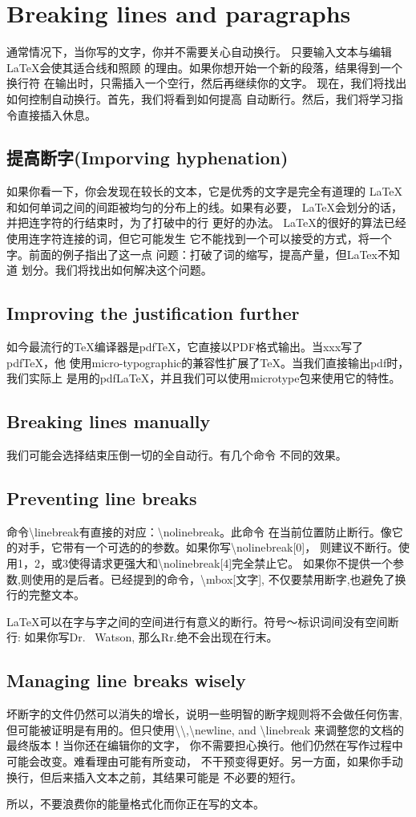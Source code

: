 \section{Breaking lines and paragraphs}
通常情况下，当你写的文字，你并不需要关心自动换行。
只要输入文本与编辑LaTeX会使其适合线和照顾
的理由。如果你想开始一个新的段落，结果得到一个换行符
在输出时，只需插入一个空行，然后再继续你的文字。
现在，我们将找出如何控制自动换行。首先，我们将看到如何提高
自动断行。然后，我们将学习指令直接插入休息。
\subsection{提高断字(Imporving hyphenation)}
如果你看一下，你会发现在较长的文本，它是优秀的文字是完全有道理的
LaTeX和如何单词之间的间距被均匀的分布上的线。如果有必要，
LaTeX会划分的话，并把连字符的行结束时，为了打破中的行
更好的办法。 LaTeX的很好的算法已经使用连字符连接的词，但它可能发生
它不能找到一个可以接受的方式，将一个字。前面的例子指出了这一点
问题：打破了词的缩写，提高产量，但LaTex不知道
划分。我们将找出如何解决这个问题。
\subsection{Improving the justification further}
如今最流行的TeX编译器是pdfTeX，它直接以PDF格式输出。当xxx写了pdfTeX，他
使用micro-typographic的兼容性扩展了TeX。当我们直接输出pdf时，我们实际上
是用的pdfLaTeX，并且我们可以使用microtype包来使用它的特性。
\subsection{Breaking lines manually}
我们可能会选择结束压倒一切的全自动行。有几个命令
不同的效果。	
\subsection{Preventing line breaks}
命令\textbackslash linebreak有直接的对应：\textbackslash nolinebreak。此命令
在当前位置防止断行。像它的对手，它带有一个可选的的参数。如果你写\textbackslash nolinebreak[0]，
则建议不断行。使用1，2，或3使得请求更强大和\textbackslash nolinebreak[4]完全禁止它。
如果你不提供一个参数,则使用的是后者。已经提到的命令，\textbackslash mbox[文字],
不仅要禁用断字,也避免了换行的完整文本。	

LaTeX可以在字与字之间的空间进行有意义的断行。符号〜标识词间没有空间断行:
如果你写Dr. ~Watson, 那么Rr.绝不会出现在行末。
\subsection{Managing line breaks wisely}
坏断字的文件仍然可以消失的增长，说明一些明智的断字规则将不会做任何伤害,
但可能被证明是有用的。但只使用\textbackslash\textbackslash,\textbackslash newline,
and \textbackslash linebreak 来调整您的文档的最终版本！当你还在编辑你的文字，
你不需要担心换行。他们仍然在写作过程中可能会改变。难看理由可能有所变动，
不干预变得更好。另一方面，如果你手动换行，但后来插入文本之前，其结果可能是
不必要的短行。

所以，不要浪费你的能量格式化而你正在写的文本。	

